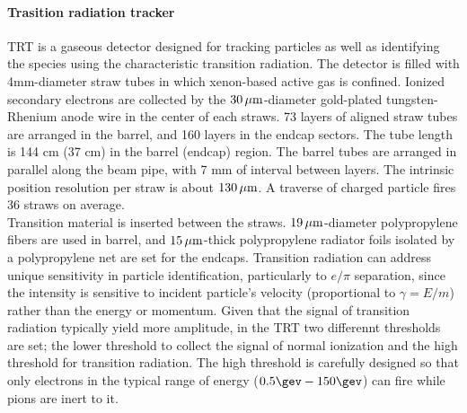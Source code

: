 

\paragraph{Trasition radiation tracker}
TRT is a gaseous detector designed for tracking particles as well as identifying the species using the characteristic transition radiation.
The detector is filled with 4mm-diameter straw tubes in which xenon-based active gas is confined.
Ionized secondary electrons are collected by the $30 \, \mathrm{\mu m}$-diameter gold-plated tungsten-Rhenium anode wire in the center of each straws.
73 layers of aligned straw tubes are arranged in the barrel, and 160 layers in the endcap sectors. 
The tube length is 144 cm (37 cm) in the barrel (endcap) region. 
The barrel tubes are arranged in parallel along the beam pipe, with 7 mm of interval between layers.
The intrinsic position resolution per straw is about $130 \, \mathrm{\mu m}$.
A traverse of charged particle fires 36 straws on average. \\

Transition material is inserted between the straws.
$19\, \mathrm{\mu m}$-diameter polypropylene fibers are used in barrel, and $15\, \mathrm{\mu m}$-thick polypropylene radiator foils isolated by a polypropylene net are set for the endcaps.
Transition radiation can address unique sensitivity in particle identification, particularly to  $e/\pi$ separation, 
since the intensity is sensitive to incident particle's velocity (proportional to $\gamma=E/m$) rather than the energy or momentum. 
Given that the signal of transition radiation typically yield more amplitude, in the TRT two differennt thresholds are set; 
the lower threshold to collect the signal of normal ionization and the high threshold for transition radiation. 
The high threshold is carefully designed so that only electrons in the typical range of energy ($0.5\gev - 150 \gev$) can fire while pions are inert to it. \\

